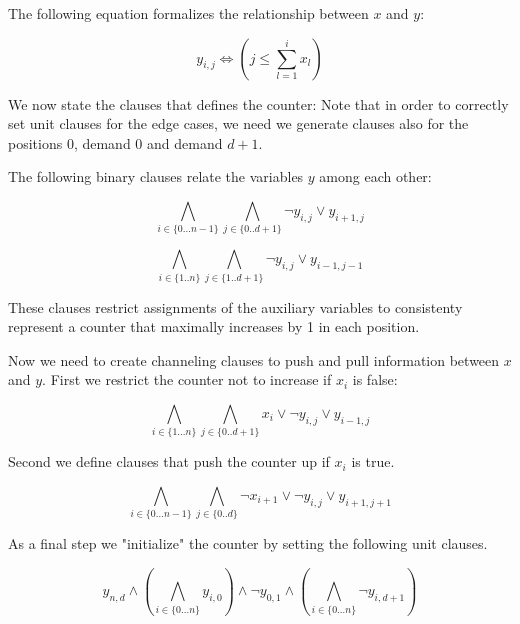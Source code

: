 \documentclass[]{llncs}
\begin{document}
The following equation formalizes the relationship between $x$ and $y$: 

    $$ y_{i,j} \iff (j \leq \sum_{l=1}^{i} x_{l}) $$

We now state the clauses that defines the counter: Note that in order to correctly set unit clauses for the edge
cases, we need we generate clauses also for the positions $0$, demand $0$ and demand $d+1$. 

The following binary clauses relate the variables $y$ among each other:

\begin{equation} \label{eq:1}
    \bigwedge_{i \in \{0\ldots n-1\}} \bigwedge_{j \in\{0..d+1\}}
    \neg y_{i,j} \vee y_{i+1,j}
\end{equation}

\begin{equation} \label{eq:2}
    \bigwedge_{i \in \{1..n\}} \bigwedge_{j\in \{1..d+1\}}
    \neg y_{i,j} \vee y_{i-1,j-1}
\end{equation}

These clauses restrict assignments of the auxiliary variables to consistenty represent a counter that maximally
increases by 1 in each position. 

Now we need to create channeling clauses to push and pull information between $x$ and $y$.  First we restrict the
counter not to increase if $x_{i}$ is false:

\begin{equation} \label{eq:3}
    \bigwedge_{i \in \{1\ldots n\}} \bigwedge_{j\in\{0..d+1\}}
    x_{i} \vee \neg y_{i,j} \vee y_{i-1,j}
\end{equation}

Second we define clauses that push  the counter up if $x_i$ is true. 

\begin{equation} \label{eq:4}
    \bigwedge_{i \in \{0\ldots n-1\}} \bigwedge_{j\in\{0..d\}}
    \neg x_{i+1} \vee \neg y_{i,j} \vee y_{i+1,j+1}
\end{equation}

As a final step we "initialize" the counter by setting the following unit clauses. 

\begin{equation} \label{eq:5}
    y_{n,d} \wedge \left (\bigwedge_{i\in\{0\ldots n\}} y_{i,0} \right )\wedge \neg
    y_{0,1} \wedge \left(\bigwedge_{i\in\{0\ldots n\}} \neg
        y_{i,d+1}\right )
\end{equation}
\end{document}
